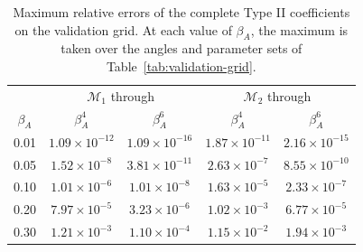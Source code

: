 \begin{table}[!htb]
\centering

\small
\setlength{\tabcolsep}{3pt}

\begin{tabular}{ccccc}
\toprule
& \multicolumn{2}{c}{$\mathcal{M}_1$ through} & \multicolumn{2}{c}{$\mathcal{M}_2$ through} \\
$\beta_A$ & $\beta_A^4$ & $\beta_A^6$ & $\beta_A^4$ & $\beta_A^6$ \\
\midrule
0.01 & $1.09\times 10^{-12}$ & $1.09\times 10^{-16}$ & $1.87\times 10^{-11}$ & $2.16\times 10^{-15}$ \\
0.05 & $1.52\times 10^{-8}$ & $3.81\times 10^{-11}$ & $2.63\times 10^{-7}$ & $8.55\times 10^{-10}$ \\
0.10 & $1.01\times 10^{-6}$ & $1.01\times 10^{-8}$ & $1.63\times 10^{-5}$ & $2.33\times 10^{-7}$ \\
0.20 & $7.97\times 10^{-5}$ & $3.23\times 10^{-6}$ & $1.02\times 10^{-3}$ & $6.77\times 10^{-5}$ \\
0.30 & $1.21\times 10^{-3}$ & $1.10\times 10^{-4}$ & $1.15\times 10^{-2}$ & $1.94\times 10^{-3}$ \\
\bottomrule
\end{tabular}
\caption{Maximum relative errors of the complete Type II coefficients on the validation grid. At each value of $\beta_A$, the maximum is taken over the \AnglePointCount{} angles and \ParameterSetCount{} parameter sets of Table~\ref{tab:validation-grid}.}
\label{tab:AA-threshold-accuracy}
\end{table}
